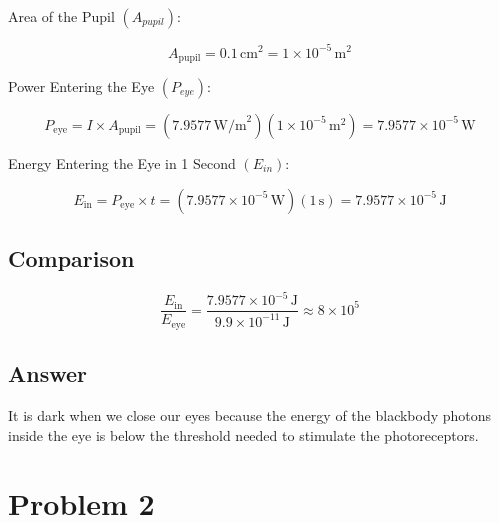 \documentclass[12pt]{article}
\begin{document}
Area of the Pupil $(A_{pupil})$:

\[
    A_{\text{pupil}}
    = 0.1\, \text{cm}^2
    = 1 \times 10^{-5}\, \text{m}^2
\]

Power Entering the Eye $(P_{eye})$:

\[
    P_{\text{eye}}
    = I \times A_{\text{pupil}}
    = (7.9577\, \text{W/m}^2)(1 \times 10^{-5}\, \text{m}^2)
    = 7.9577 \times 10^{-5}\, \text{W}
\]

Energy Entering the Eye in 1 Second $(E_{in})$:

\[
    E_{\text{in}}
    = P_{\text{eye}} \times t
    = (7.9577 \times 10^{-5}\, \text{W})(1\, \text{s})
    = 7.9577 \times 10^{-5}\, \text{J}
\]

\subsection{Comparison}

\[
    \frac{E_{\text{in}}}{E_{\text{eye}}}
    = \frac{7.9577 \times 10^{-5}\, \text{J}}{9.9 \times 10^{-11}\, \text{J}} \approx 8 \times 10^5
\]

\subsection{Answer}

It is dark when we close our eyes because the energy of the blackbody photons inside the eye is
below the threshold needed to stimulate the photoreceptors.

\newpage

\section{Problem 2}


\end{document}

